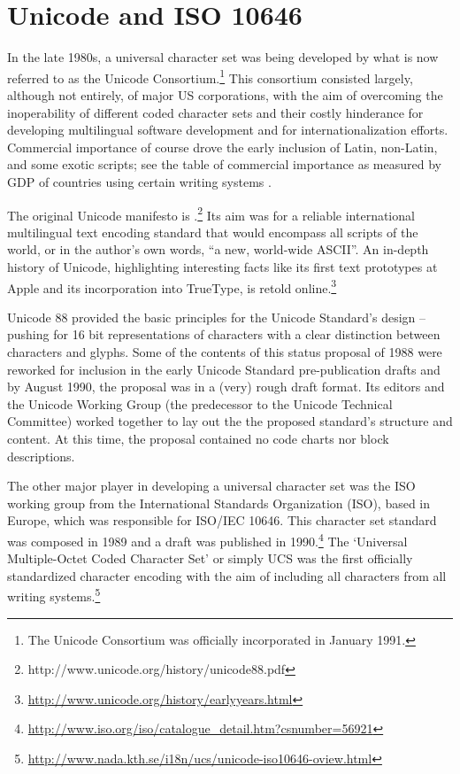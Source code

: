	
\section{Unicode and ISO 10646}

In the late 1980s, a universal character set was being developed by what 
is now referred to as the Unicode Consortium.\footnote{The Unicode 
Consortium was officially incorporated in January 1991.} This consortium 
consisted largely, although not entirely, of major US corporations, with 
the aim of overcoming the inoperability of different coded character sets 
and their costly hinderance for developing multilingual software development 
and for internationalization efforts. Commercial importance of course drove 
the early inclusion of Latin, non-Latin, and some exotic scripts; see the 
table of commercial importance as measured by GDP of countries using certain 
writing systems \citep[2]{unicode88}.

The original Unicode manifesto is \cite{unicode88.pdf}.\footnote{http://www.unicode.org/history/unicode88.pdf} 
Its aim was for a reliable international multilingual text encoding standard 
that would encompass all scripts of the world, or in the author's own words, 
``a new, world-wide ASCII''. An in-depth history of Unicode, highlighting 
interesting facts like its first text prototypes at Apple and its incorporation 
into TrueType, is retold online.\footnote{\url{http://www.unicode.org/history/earlyyears.html}}

Unicode 88 provided the basic principles for the Unicode Standard's design -- 
pushing for 16 bit representations of characters with a clear distinction 
between characters and glyphs. Some of the contents of this status proposal 
of 1988 were reworked for inclusion in the early Unicode Standard pre-publication 
drafts and by August 1990, the proposal was in a (very) rough draft format. Its 
editors and the Unicode Working Group (the predecessor to the Unicode Technical 
Committee) worked together to lay out the the proposed standard's structure and 
content. At this time, the proposal contained no code charts nor block descriptions. 


The other major player in developing a universal character set was the ISO 
working group from the International Standards Organization (ISO), based 
in Europe, which was responsible for ISO/IEC 10646. This character set 
standard was composed in 1989 and a draft was published in 1990.\footnote{\url{http://www.iso.org/iso/catalogue_detail.htm?csnumber=56921}} 
The `Universal Multiple-Octet Coded Character Set' or simply UCS was the first 
officially standardized character encoding with the aim of including all characters from all writing systems.\footnote{\url{http://www.nada.kth.se/i18n/ucs/unicode-iso10646-oview.html}}

